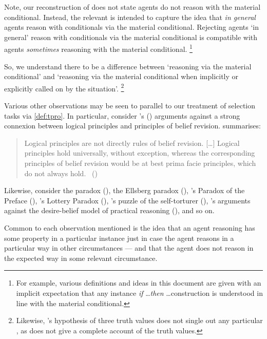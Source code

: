 \begin{note}
  Note, our reconstruction of \citeauthor{Wason:1966aa} does not state agents do not reason with the material conditional.
  Instead, the relevant \torN{} is intended to capture the idea that \emph{in general} agents reason with conditionals via the material conditional.
  Rejecting agents `in general' reason with conditionals via the material conditional is compatible with agents \emph{sometimes} reasoning with the material conditional.%
  \footnote{
    For example, various definitions and ideas in this document are given with an implicit expectation that any instance \emph{if} \dots \emph{then} \dots construction is understood in line with the material conditional.
  }

  So, we understand there to be a difference between `reasoning via the material conditional' and `reasoning via the material conditional when implicitly or explicitly called on by the situation'.%
  \footnote{
    Likewise, \citeauthor{Wason:1966aa}'s hypothesis of three truth values does not single out any particular \torN{}, as \citeauthor{Wason:1966aa} does not give a complete account of the truth values.
  }
\end{note}


\begin{note}
  Various other observations may be seen to parallel to our treatment of selection tasks via \autoref{def:tpro}.
  In particular, consider \citeauthor{Harman:1984aa}'s (\citeyear{Harman:1984aa,Harman:1986ux}) arguments against a strong connexion between logical principles and principles of belief revision.
  \citeauthor{Harman:1984aa} summarises:
  \begin{quote}
    Logical principles are not directly rules of belief revision.
    [\dots]
    Logical principles hold universally, without exception, whereas the corresponding principles of belief revision would be at best prima facie principles, which do not always hold.%
    \mbox{ }\hfill\mbox{(\citeyear[107--108]{Harman:1984aa})}
  \end{quote}
  Likewise, consider the \citeauthor{Allais:1979aa} paradox (\cite{Allais:1979aa}),
  the Ellsberg paradox (\cite{Ellsberg:1961aa}), \citeauthor{Makinson:1965aa}'s Paradox of the Preface (\citeyear{Makinson:1965aa}), \citeauthor{Kyburg:1997aa}'s Lottery Paradox (\citeyear{Kyburg:1997aa}), \citeauthor{Quinn:1990aa}'s puzzle of the self-torturer (\citeyear{Quinn:1990aa}), \citeauthor{Bratman:1981aa}'s arguments against the desire-belief model of practical reasoning (\citeyear{Bratman:1981aa,Bratman:1987aa}), and so on.

  Common to each observation mentioned is the idea that an agent \agents{} reasoning has some property in a particular instance just in case the agent reasons in a particular way in other circumstances --- and that the agent does not reason in the expected way in some relevant circumstance.
\end{note}



